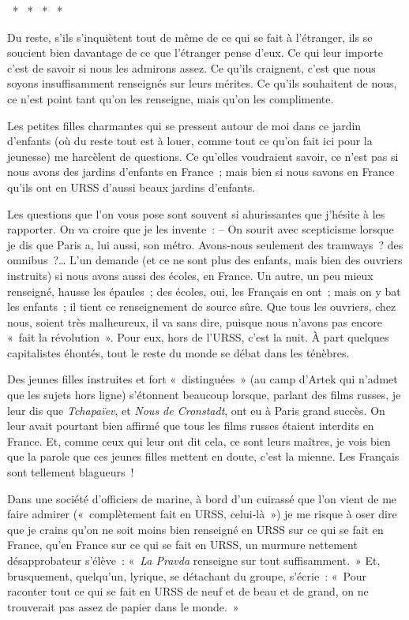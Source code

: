 \documentclass[french,twoside]{book} %
\begin{document}
{\centering \noindent *  *  *  *  *\par}
\noindent Du reste, s’ils s’inquiètent tout de même de ce qui se fait à l’étranger, ils se soucient bien davantage de ce que l’étranger pense d’eux. Ce qui leur importe c’est de savoir si nous les admirons assez. Ce qu’ils craignent, c’est que nous soyons insuffisamment renseignés sur leurs mérites. Ce qu’ils souhaitent de nous, ce n’est point tant qu’on les renseigne, mais qu’on les complimente.\par
Les petites filles charmantes qui se pressent autour de moi dans ce jardin d’enfants (où du reste tout est à louer, comme tout ce qu’on fait ici pour la jeunesse) me harcèlent de questions. Ce qu’elles voudraient savoir, ce n’est pas si nous avons des jardins d’enfants en France ; mais bien si nous savons en France qu’ils ont en URSS d’aussi beaux jardins d’enfants.\par
Les questions que l’on vous pose sont souvent si ahurissantes que j’hésite à les rapporter. On va croire que je les invente : – On sourit avec scepticisme lorsque je dis que Paris a, lui aussi, son métro. Avons-nous seulement des tramways ? des omnibus ?… L’un demande (et ce ne sont plus des enfants, mais bien des ouvriers instruits) si nous avons aussi des écoles, en France. Un autre, un peu mieux renseigné, hausse les épaules ; des écoles, oui, les Français en ont ; mais on y bat les enfants ; il tient ce renseignement de source sûre. Que tous les ouvriers, chez nous, soient très malheureux, il va sans dire, puisque nous n’avons pas encore « fait la révolution ». Pour eux, hors de l’URSS, c’est la nuit. À part quelques capitalistes éhontés, tout le reste du monde se débat dans les ténèbres.\par
Des jeunes filles instruites et fort « distinguées » (au camp d’Artek qui n’admet que les sujets hors ligne) s’étonnent beaucoup lorsque, parlant des films russes, je leur dis que \emph{Tchapaïev}, et \emph{Nous de Cronstadt}, ont eu à Paris grand succès. On leur avait pourtant bien affirmé que tous les films russes étaient interdits en France. Et, comme ceux qui leur ont dit cela, ce sont leurs maîtres, je vois bien que la parole que ces jeunes filles mettent en doute, c’est la mienne. Les Français sont tellement blagueurs !\par
Dans une société d’officiers de marine, à bord d’un cuirassé que l’on vient de me faire admirer (« complètement fait en URSS, celui-là ») je me risque à oser dire que je crains qu’on ne soit moins bien renseigné en URSS sur ce qui se fait en France, qu’en France sur ce qui se fait en URSS, un murmure nettement désapprobateur s’élève : « \emph{La Pravda} renseigne sur tout suffisamment. » Et, brusquement, quelqu’un, lyrique, se détachant du groupe, s’écrie : « Pour raconter tout ce qui se fait en URSS de neuf et de beau et de grand, on ne trouverait pas assez de papier dans le monde. »\par
\end{document}
